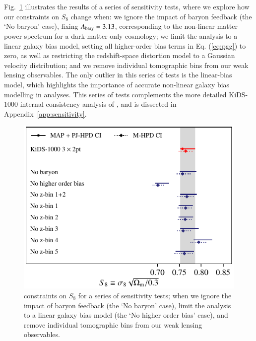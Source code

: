 Fig.~\ref{fig:S8comp_sensitivity} illustrates the results of a series of sensitivity tests, where we explore how our \tttp constraints on $S_8$ change when: 
we ignore the impact of baryon feedback (the `No baryon' case), fixing $A_{\rm bary}=3.13$, corresponding to the non-linear matter power spectrum for a dark-matter only cosmology; 
we limit the analysis to a linear galaxy bias model, setting all higher-order bias terms in Eq. (\ref{eq:pgg}) to zero, as well as restricting the redshift-space distortion model to a Gaussian velocity distribution; 
and we remove individual tomographic bins from our weak lensing observables. 
The only outlier in this series of tests is the linear-bias model, which highlights the importance of accurate non-linear galaxy bias modelling in \tttp analyses. 
This series of tests complements the more detailed KiDS-1000 internal consistency analysis of \citet{asgari/etal:inprep}, and is dissected in Appendix~\ref{app:sensitivity}.

\begin{figure}
	\begin{center}
		\includegraphics[width=\columnwidth]{Parameter_Plots/systematics/S8_comparison_blindC}
		\caption{\tttp constraints on $S_8$ for a series of sensitivity tests; when we ignore the impact of baryon feedback (the `No baryon' case), limit the analysis to a linear galaxy bias model (the `No higher order bias' case), and remove individual tomographic bins from our weak lensing observables.  
		\label{fig:S8comp_sensitivity}}
	\end{center}
\end{figure}

